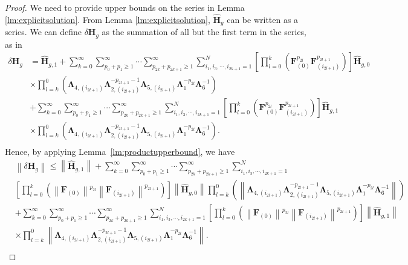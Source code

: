 \documentclass[twoside,11pt]{article}
\newcommand{\norm}[1]{\left\lVert#1\right\rVert}
\newcommand{\matF}{\mathbf{F}}
\newcommand{\hmatH}{{\hat{\mathbf{H}}}{}}
\newcommand{\matLambda}{\mathbf{\Lambda}}
\newcommand{\dtmatH}{\delta\mathbf{H}}
\begin{document}
\begin{proof}
We need to provide upper bounds on the series in Lemma \ref{lm:explicitsolution}. From Lemma \ref{lm:explicitsolution}, $\hmatH_g$ can be written as a series. We can define $\dtmatH_g$ as the summation of all but the first term in the series, as in
\begin{equation*}
\begin{aligned}
\dtmatH_g&=\hmatH_{g,1}+\sum_{k=0}^\infty\sum_{p_0+p_1\ge 1}^{\infty}\cdots\sum_{p_{2k}+p_{2k+1}\ge 1}^{\infty}\sum_{i_1,i_3,\cdots,i_{2k+1}=1}^N\left[\prod_{l=0}^{k}\left(\matF_{(0)}^{p_{2l}}\matF_{(i_{2l+1})}^{p_{2l+1}}\right)\right]\hmatH_{g,0}\\
&\times \prod_{l=k}^0\left(\matLambda_{4,(i_{2l+1})}\matLambda_{2,(i_{2l+1})}^{-p_{2l+1}-1}\matLambda_{5,(i_{2l+1})}\matLambda_{1}^{-p_{2l}}\matLambda_6^{-1}\right)\\
&+\sum_{k=0}^\infty\sum_{p_0+p_1\ge 1}^{\infty}\cdots\sum_{p_{2k}+p_{2k+1}\ge 1}^{\infty}\sum_{i_1,i_3,\cdots,i_{2k+1}=1}^N\left[\prod_{l=0}^{k}\left(\matF_{(0)}^{p_{2l}}\matF_{(i_{2l+1})}^{p_{2l+1}}\right)\right]\hmatH_{g,1}\\
&\times \prod_{l=k}^0\left(\matLambda_{4,(i_{2l+1})}\matLambda_{2,(i_{2l+1})}^{-p_{2l+1}-1}\matLambda_{5,(i_{2l+1})}\matLambda_{1}^{-p_{2l}}\matLambda_6^{-1}\right).\\
\end{aligned}
\end{equation*}
Hence, by applying Lemma~\ref{lm:productupperbound}, we have
\begin{align*}
&\norm{\dtmatH_g}\le\norm{\hmatH_{g,1}}+\sum_{k=0}^\infty\sum_{p_0+p_1\ge 1}^{\infty}\cdots\sum_{p_{2k}+p_{2k+1}\ge 1}^{\infty}\sum_{i_1,i_3,\cdots,i_{2k+1}=1}^N\\
&\left[\prod_{l=0}^{k}\left(\norm{\matF_{(0)}}^{p_{2l}}\norm{\matF_{(i_{2l+1})}}^{p_{2l+1}}\right)\right]\norm{\hmatH_{g,0}}\prod_{l=k}^0\left(\norm{\matLambda_{4,(i_{2l+1})}\matLambda_{2,(i_{2l+1})}^{-p_{2l+1}-1}\matLambda_{5,(i_{2l+1})}\matLambda_{1}^{-p_{2l}}\matLambda_6^{-1}}\right)\\
&+\sum_{k=0}^\infty\sum_{p_0+p_1\ge 1}^{\infty}\cdots\sum_{p_{2k}+p_{2k+1}\ge 1}^{\infty}\sum_{i_1,i_3,\cdots,i_{2k+1}=1}^N\left[\prod_{l=0}^{k}\left(\norm{\matF_{(0)}}^{p_{2l}}\norm{\matF_{(i_{2l+1})}}^{p_{2l+1}}\right)\right]\norm{\hmatH_{g,1}}\\
&\times \prod_{l=k}^0\norm{\matLambda_{4,(i_{2l+1})}\matLambda_{2,(i_{2l+1})}^{-p_{2l+1}-1}\matLambda_{5,(i_{2l+1})}\matLambda_{1}^{-p_{2l}}\matLambda_6^{-1}}.\\

\end{align*}
\end{proof}
\end{document}
